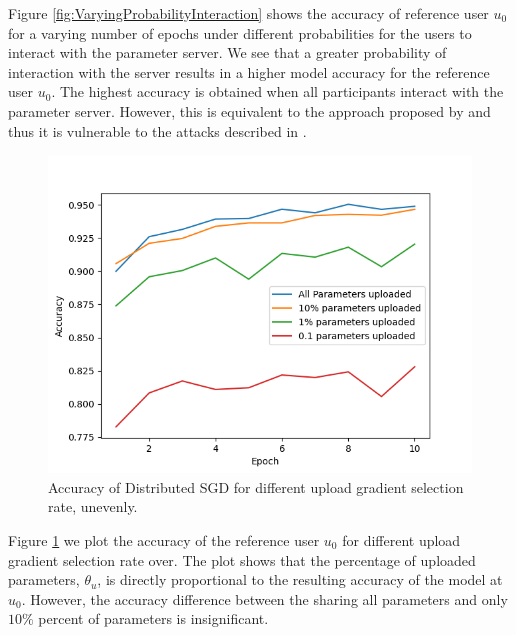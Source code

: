 \documentclass[conference]{IEEEtran}
\begin{document}
Figure \ref{fig:VaryingProbabilityInteraction} shows the accuracy of reference user $u_0$ for a varying number of epochs under
different probabilities for the users to interact with the parameter server. 
We see that a greater probability of interaction with the server results in a higher model accuracy for the reference user $u_0$.
The highest accuracy is obtained when all participants interact with the parameter server. However, this is equivalent to the
approach proposed by \cite{shokri2015privacy} and thus it is vulnerable to the attacks described in \cite{hitaj2017deep}. 


\begin{figure}[!h]
\centering
\includegraphics[width=\columnwidth, keepaspectratio]{VaryingThetaU}
\caption{Accuracy of Distributed SGD for different upload gradient selection rate, unevenly. }
\label{fig:VaryingThetaU}
\end{figure}

Figure \ref{fig:VaryingThetaU} we plot the accuracy of the reference user $u_0$ for different upload gradient selection rate over. 
The plot shows that the percentage of uploaded parameters, $\theta_u$, is directly proportional to the resulting accuracy of
the model at $u_0$. However, the accuracy difference between the sharing all parameters and only $ 10\% $ percent of parameters is
insignificant.
\end{document}
